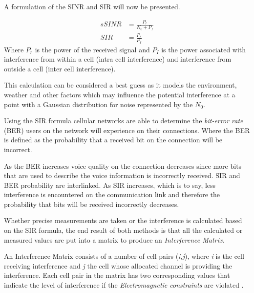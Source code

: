A formulation of the SINR and SIR will now be presented.

\begin{align}s 
	SINR &= \frac{P_r}{N_0 + P_I}\\
	SIR &= \frac{P_r}{P_I}
\end{align}
Where $P_r$ is the power of the received signal and $P_I$ is the power associated with interference from within a cell (intra cell interference) and interference from outside a cell (inter cell interference)\cite{WirelessCommunications}.

This calculation can be considered a best guess as it models the environment, weather and other factors which may influence the potential interference at a point with a Gaussian distribution for noise represented by the $N_0$\cite{Karen2004,WirelessCommunications}. 

Using the SIR formula cellular networks are able to determine the \emph{bit-error rate} (BER) users on the network will experience on their connections\cite{WirelessCommunications,WirelessDigitalCommunications}. Where the BER is defined as the probability that a received bit on the connection will be incorrect\cite{WirelessDigitalCommunications,WirelessCommunications,MobileWirelessCommunications}. 

As the BER increases voice quality on the connection decreases since more bits that are used to describe the voice information is incorrectly received. SIR and BER probability are interlinked. As SIR increases, which is to say, less interference is encountered on the communication link and therefore the probability that bits will be received incorrectly decreases\cite{WirelessDigitalCommunications,WirelessCommunications,MobileWirelessCommunications}.

Whether precise measurements are taken or the interference is calculated based on the SIR formula, the end result of both methods is that all the calculated or measured values are put into a matrix to produce an \emph{Interference Matrix}\cite{ACOvsEA}.

An Interference Matrix consists of a number of cell pairs (\emph{i,j}), where \emph{i} is the cell receiving interference and \emph{j} the cell whose allocated channel is providing the interference. Each cell pair in the matrix has two corresponding values that indicate the level of interference if the \emph{Electromagnetic constraints} are violated \cite{Eisenblatter,Karen2004,ACOvsEA,AndreasPaper}. 

